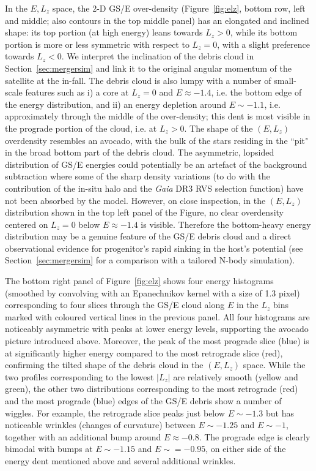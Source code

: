 \documentclass[a4paper,useAMS,usenatbib]{mnras}
\begin{document}
In the $E, L_z$ space, the 2-D GS/E over-density (Figure~\ref{fig:elz}, bottom row, left and middle; also contours in the top middle panel) has an elongated and inclined shape: its top portion (at high energy) leans towards $L_z>0$, while its bottom portion is more or less symmetric with respect to $L_z=0$, with a slight preference towards $L_z<0$. We interpret the inclination of the debris cloud in Section~\ref{sec:mergersim} and link it to the original angular momentum of the satellite at the in-fall. The debris cloud is also lumpy with a number of small-scale features such as i) a core at $L_z=0$ and $E\approx-1.4$, i.e. the bottom edge of the energy distribution, and ii) an energy depletion around $E\sim-1.1$, i.e. approximately through the middle of the over-density; this dent is most visible in the prograde portion of the cloud, i.e. at $L_z>0$. The shape of the $(E,L_z)$ overdensity resembles an avocado, with the bulk of the stars residing in the ``pit" in the broad bottom part of the debris cloud. The asymmetric, lopsided distribution of GS/E energies could potentially be an artefact of the background subtraction where some of the sharp density variations (to do with the contribution of the in-situ halo and the {\it Gaia} DR3 RVS selection function) have not been absorbed by the model. However, on close inspection, in the $(E, L_z)$ distribution shown in the top left panel of the Figure, no clear overdensity centered on $L_z=0$ below $E\approx-1.4$ is visible. Therefore the bottom-heavy energy distribution may be a genuine feature of the GS/E debris cloud and a direct observational evidence for progenitor's rapid sinking in the host's potential (see Section~\ref{sec:mergersim} for a comparison with a tailored N-body simulation).

The bottom right panel of Figure~\ref{fig:elz} shows four energy histograms (smoothed by convolving with an Epanechnikov kernel with a size of 1.3 pixel) corresponding to four slices through the GS/E cloud along $E$ in the $L_z$ bins marked with coloured vertical lines in the previous panel. All four histograms are noticeably asymmetric with peaks at lower energy levels, supporting the avocado picture introduced above. Moreover, the peak of the most prograde slice (blue) is at significantly higher energy compared to the most retrograde slice (red), confirming the tilted shape of the debris cloud in the  $(E, L_z)$ space. While the two profiles corresponding to the lowest $|L_z|$ are relatively smooth (yellow and green), the other two distributions corresponding to the most retrograde (red) and the most prograde (blue) edges of the GS/E debris show a number of wiggles. For example, the retrograde slice peaks just below $E\sim-1.3$ but has noticeable wrinkles (changes of curvature) between $E\sim-1.25$ and $E\sim-1$, together with an additional bump around $E\approx-0.8$. The prograde edge is clearly bimodal with bumps at $E\sim-1.15$ and $E\sim=-0.95$, on either side of the energy dent mentioned above and several additional wrinkles.
\end{document}
